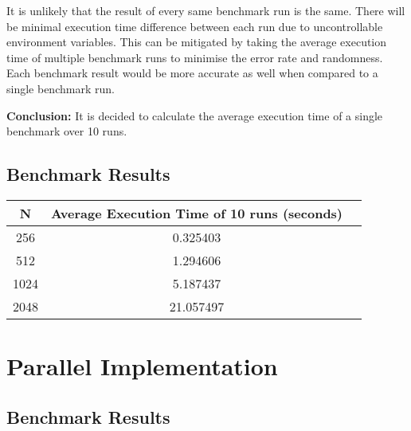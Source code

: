\documentclass[12pt, a4paper]{article}
\begin{document}
\noindent It is unlikely that the result of every same benchmark run is the same. There will be
minimal execution time difference between each run due to uncontrollable environment variables. This
can be mitigated by taking the average execution time of multiple benchmark runs to minimise the
error rate and randomness. Each benchmark result would be more accurate as well when compared to a
single benchmark run.

\textbf{Conclusion:} It is decided to calculate the average execution time of a single benchmark
over 10 runs.

\subsection{Benchmark Results}
\begin{table}[H]
\centering
\begin{tabular}{|c|c|c|}
\hline
\rowcolor[HTML]{D8D8D8}
N    & Average Execution Time of 10 runs (seconds) \\ \hline
256  & 0.325403                                    \\
512  & 1.294606                                    \\
1024 & 5.187437                                    \\
2048 & 21.057497                                   \\ \hline
\end{tabular}
\end{table}


\section{Parallel Implementation}


\subsection{Benchmark Results}

\printbibliography
\end{document}
